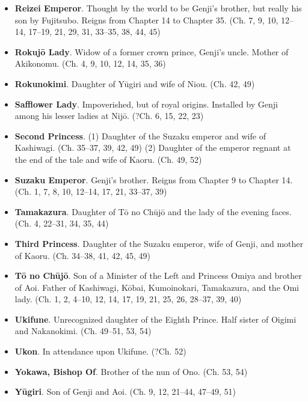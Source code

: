 \documentclass{article}
\begin{document}
\begin{multicols}{2}
\begin{small}
\begin{itemize}[
			label=,
			leftmargin=0em,
			rightmargin=-1.5em,
			itemindent=-2em,
			nosep,
		]
		\item \textbf{Reizei Emperor}. Thought by the world to be Genji's brother, but really his son by Fujitsubo. Reigns from Chapter 14 to Chapter 35. (Ch. 7, 9, 10, 12--14, 17--19, 21, 29, 31, 33--35, 38, 44, 45)

		\item \textbf{Rokujō Lady}. Widow of a former crown prince, Genji's uncle. Mother of Akikonomu. (Ch. 4, 9, 10, 12, 14, 35, 36)

		\item \textbf{Rokunokimi}. Daughter of Yūgiri and wife of Niou. (Ch. 42, 49)

		\item \textbf{Safflower Lady}. Impoverished, but of royal origins. Installed by Genji among his lesser ladies at Nijō. (?Ch. 6, 15, 22, 23)

		\item \textbf{Second Princess}. 
		(1) Daughter of the Suzaku emperor and wife of Kashiwagi. (Ch. 35--37, 39, 42, 49)
		(2) Daughter of the emperor regnant at the end of the tale and wife of Kaoru. (Ch. 49, 52)

		\item \textbf{Suzaku Emperor}. Genji's brother. Reigns from Chapter 9 to Chapter 14. (Ch. 1, 7, 8, 10, 12--14, 17, 21, 33--37, 39)

		\item \textbf{Tamakazura}. Daughter of Tō no Chūjō and the lady of the evening faces. (Ch. 4, 22--31, 34, 35, 44)

		\item \textbf{Third Princess}. Daughter of the Suzaku emperor, wife of Genji, and mother of Kaoru. (Ch. 34--38, 41, 42, 45, 49)

		\item \textbf{Tō no Chūjō}. Son of a Minister of the Left and Princess Omiya and brother of Aoi. Father of Kashiwagi, Kōbai, Kumoinokari, Tamakazura, and the Omi lady. (Ch. 1, 2, 4--10, 12, 14, 17, 19, 21, 25, 26, 28--37, 39, 40)

		\item \textbf{Ukifune}. Unrecognized daughter of the Eighth Prince. Half sister of Oigimi and Nakanokimi. (Ch. 49--51, 53, 54)

		\item \textbf{Ukon}. In attendance upon Ukifune. (?Ch. 52)

		\item \textbf{Yokawa, Bishop Of}. Brother of the nun of Ono. (Ch. 53, 54)

		\item \textbf{Yūgiri}. Son of Genji and Aoi. (Ch. 9, 12, 21--44, 47--49, 51)

	\end{itemize}


	\end{small}

\end{multicols}
\end{document}
